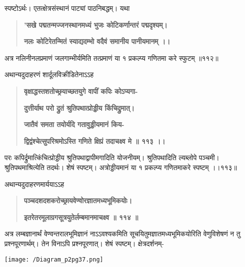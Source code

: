 \documentclass[11pt, openany]{book}
\begin{document}
\begin{sloppypar}
\hangindent=0.2in \hspace{0.2in}स्पष्टोऽर्थः। एतत्क्षेत्रसंस्थानं पाट्यां पाठनिबद्धम्। यथा\textendash

\begin{quote}
\hspace{0.5in}\textbf{'सखे पद्मतन्मज्जनस्थानमध्यं भुजः कोटिकर्णान्तरं पद्मदृश्यम्।}

\hspace{0.5in}\textbf{नलः कोटिरेतन्मितं स्याद्यदम्भो वदैवं समानीय पानीयमानम् ।।}
\end{quote}

\hangindent=0.2in \hspace{0.2in}अत्र नलिनीनलप्रमाणं जलगाम्भीर्यमिति तत्प्रमाणं या १ प्रकल्प्य गणितमा करे स्फुटम् ॥११२॥

\hangindent=0.2in \hspace{0.2in}अथान्यदुदाहरणं शार्दूलविक्रीडितेनाऽऽह\textendash

\begin{quote}
\hspace{0.5in}\textbf{वृक्षाद्धस्तशतोच्छ्रयाच्छतयुगे वापीं कपिः कोऽप्यगा-}

\hspace{0.5in}\textbf{दुत्तीर्याथ परो द्रुतं श्रुतिपथात्प्रोड्डीय किंचिद्रुमात्।}

\hspace{0.5in}\textbf{जातैवं समता तयोर्यदि गतावुड्डीयमानं किय-}

\hspace{0.5in}\textbf{द्विद्वंश्चेत्सुपरिश्रमोऽस्ति गणिते क्षिप्रं तदाचक्ष्व मे ॥ ११३ ।।}
\end{quote}

\hangindent=0.2in \hspace{0.2in}परः कपिर्द्रुमात्किंचित्प्रोड्डीय श्रुतिपथाद्वापीमगादिति योजनीयम्। श्रुतिपथादिति ल्यब्लोपे पञ्चमी। श्रुतिपथमाश्रित्येति तदर्थः। शेषं स्पष्टम्। अत्रोड्डीयमानं या १ प्रकल्प्य गणितमाकरे स्पष्टम् ।।११३॥

\hangindent=0.2in \hspace{0.2in}अथान्यदुदाहरणमार्ययाऽऽह\textendash

\begin{quote}
\hspace{0.5in}\textbf{पञ्चदशदशकरोच्छ्रायवेण्वोरज्ञातमध्यभूमिकयोः।}

\hspace{0.5in}\textbf{इतरेतरमूलाग्रगसूत्रयुतेर्लम्बमानमाचक्ष्व ॥ ११४ ॥}
\end{quote}

\hangindent=0.2in \hspace{0.2in}अत्र लम्बज्ञानार्थं वेण्वन्तरालभूमिज्ञानं नाऽऽवश्यकमिति सूचयितुमज्ञातमध्यभूमिकयोरिति वेणुविशेषणं न तु प्रश्नपूरणार्थम्। तेन विनाऽपि प्रश्नपूरणात्। शेषं स्पष्टम्। क्षेत्रदर्शनम्-

\begin{center}
    \texttt{[image: /Diagram\_p2pg37.png]}
\end{center}
\end{sloppypar}
\thispagestyle{empty}
\newpage
\end{document}
